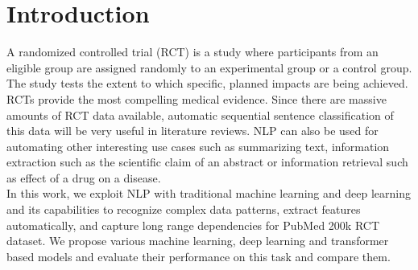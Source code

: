 \section{Introduction}
A randomized controlled trial (RCT) is a study where participants from an eligible group are assigned randomly to an experimental group or a control group. The study tests the extent to which specific, planned impacts are being achieved. RCTs provide the most compelling medical evidence. Since there are massive amounts of RCT data available, automatic sequential sentence classification of this data will be very useful in literature reviews. NLP can also be used for automating other interesting use cases such as summarizing text, information extraction such as the scientific claim of an abstract or information retrieval such as effect of a drug on a disease.\\
In this work, we exploit NLP with traditional machine learning and deep learning and its capabilities to recognize complex data patterns, extract features automatically, and capture long range dependencies for PubMed 200k RCT dataset. We propose various machine learning, deep learning and transformer based models and evaluate their performance on this task and compare them. 
\label{sec:introduction}
